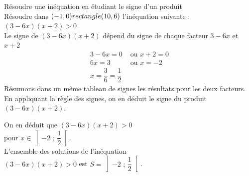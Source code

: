 \begin{Méthode}Résoudre une inéquation en étudiant le signe d'un produit \\
Résoudre dans $(-1,0) rectangle (10,6)$ l'inéquation suivante : $(3-6x)(x+2)>0$\\
Le signe de $(3 - 6x)(x + 2)$ dépend du signe de chaque facteur $3 - 6x$ et $x + 2$
\begin{align*}
3-6x=0 &\text{  ou  } x+2=0 \\
6x=3 &\text{  ou  } x=-2 \\
x=\dfrac{3}{6}=\dfrac{1}{2}
\end{align*}
Résumons dans un même tableau de signes les résultats pour les deux facteurs. En appliquant la règle des signes, on en déduit le signe du produit $(3-6x)(x + 2)$.\\
\begin{minipage}[c]{0.45\linewidth}
\end{minipage} \hfill
\begin{minipage}[c]{0.45\linewidth}
On en déduit que $(3-6x)(x+2)>0$ \\pour $x\in \left] -2 \text{ ; } \dfrac{1}{2}\right[$.\\
L'ensemble des solutions de l'inéquation \\ $(3-6x)(x + 2) > 0$ est $S= \left] -2 \text{ ; } \dfrac{1}{2}\right[$.
\end{minipage}

\end{Méthode}

